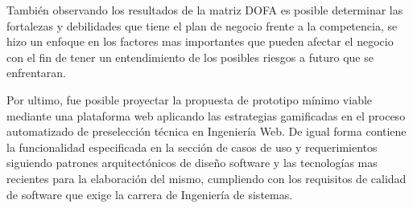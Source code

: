 También observando los resultados de la matriz DOFA es posible determinar las fortalezas y debilidades que tiene el plan de negocio frente a la competencia, se hizo un enfoque en los factores mas importantes que pueden afectar el negocio con el fin de tener un entendimiento de los posibles riesgos a futuro que se enfrentaran.

Por ultimo, fue posible proyectar la propuesta de prototipo mínimo viable mediante una plataforma web aplicando las estrategias gamificadas en el proceso automatizado de preselección técnica en Ingeniería Web. De igual forma contiene la funcionalidad especificada en la sección de casos de uso y requerimientos siguiendo patrones arquitectónicos de diseño software y las tecnologías mas recientes para la elaboración del mismo, cumpliendo con los requisitos de calidad de software que exige la carrera de Ingeniería de sistemas.

